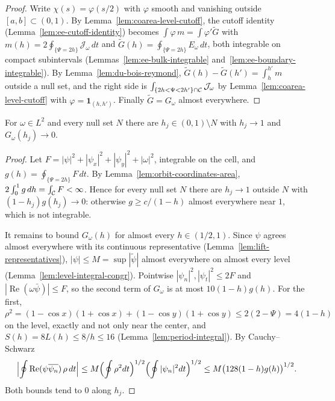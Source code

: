 \begin{proof}
\leanok
Write $\chi(s)=\varphi(s/2)$ with $\varphi$ smooth and vanishing outside $[a,b]\subset(0,1)$.
By Lemma~\ref{lem:coarea-level-cutoff}, the cutoff identity
(Lemma~\ref{lem:ee-cutoff-identity}) becomes $\int\varphi\,m=\int\varphi'\tilde G$ with
$m(h)=2\oint_{\{\Psi=2h\}}\mathcal J_\omega\,dt$ and $\tilde G(h)=\oint_{\{\Psi=2h\}}E_\omega\,dt$, both
integrable on compact subintervals (Lemmas~\ref{lem:ee-bulk-integrable}
and~\ref{lem:ee-boundary-integrable}). By Lemma~\ref{lem:du-bois-reymond},
$\tilde G(h)-\tilde G(h')=\int_h^{h'}m$ outside a null set, and the right side is
$\int_{\{2h<\Psi<2h'\}\cap\mathcal{C}}\mathcal J_\omega$ by Lemma~\ref{lem:coarea-level-cutoff} with
$\varphi=\mathbf 1_{(h,h')}$. Finally $\tilde G=G_\omega$ almost everywhere.
\end{proof}

\begin{lemma}
\label{lem:ee-center-limit}
\leanok
For $\omega\in L^2$ and every null set $N$ there are $h_j\in(0,1)\setminus N$ with $h_j\to1$
and $G_\omega(h_j)\to0$.
\end{lemma}

\begin{proof}
\leanok
Let $F=|\psi|^2+|\psi_x|^2+|\psi_y|^2+|\omega|^2$, integrable on the cell, and
$g(h)=\oint_{\{\Psi=2h\}}F\,dt$. By Lemma~\ref{lem:orbit-coordinates-area},
$2\int_0^1g\,dh=\int_{\mathcal{C}} F<\infty$. Hence for every null set $N$ there are $h_j\to1$
outside $N$ with $(1-h_j)g(h_j)\to0$: otherwise $g\ge c/(1-h)$ almost everywhere near $1$,
which is not integrable.

It remains to bound $G_\omega(h)$ for almost every $h\in(1/2,1)$. Since $\psi$ agrees almost
everywhere with its continuous representative (Lemma~\ref{lem:lift-representatives}),
$|\psi|\le M=\sup|\tilde\psi|$ almost everywhere on almost every level
(Lemma~\ref{lem:level-integral-congr}). Pointwise $|\psi_n|^2,|\psi_t|^2\le2F$ and
$|\operatorname{Re}(\omega\bar\psi)|\le F$, so the second term of $G_\omega$ is at most
$10(1-h)g(h)$. For the first, $\rho^2=(1-\cos x)(1+\cos x)+(1-\cos y)(1+\cos y)
\le2(2-\Psi)=4(1-h)$ on the level, exactly and not only near the center, and
$S(h)=8L(h)\le8/h\le16$ (Lemma~\ref{lem:period-integral}). By Cauchy--Schwarz
\[
  \Bigl|\oint\operatorname{Re}(\psi\overline{\psi_n})\,\rho\,dt\Bigr|
  \le M\Bigl(\oint\rho^2dt\Bigr)^{1/2}\Bigl(\oint|\psi_n|^2dt\Bigr)^{1/2}
  \le M\bigl(128(1-h)g(h)\bigr)^{1/2}.
\]
Both bounds tend to $0$ along $h_j$.
\end{proof}


